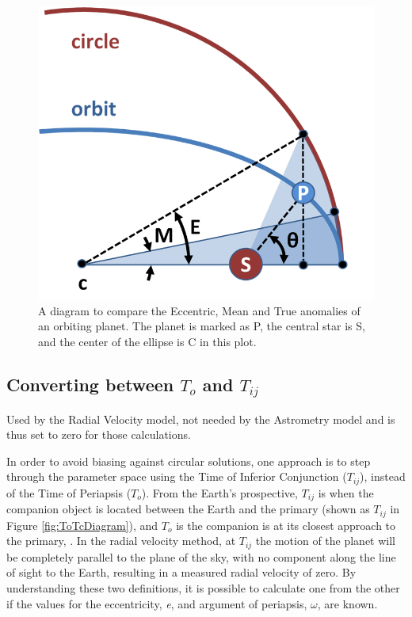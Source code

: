 \documentclass[12pt,preprint]{aastex}
\begin{document}
\begin{figure}[ht]
\begin{center}
\includegraphics[scale=0.4]{Figures/Anomalies-MOD.png}
\caption[Diagram of Anomalies]{A diagram to compare the Eccentric, Mean and True anomalies of an orbiting planet.  The planet is marked as P, the central star is S, and the center of the ellipse is C in this plot. }
\label{fig:Anomalies}
\end{center}
\end{figure}
\clearpage
\subsection{Converting between $T_o$ and $T_{ij}$}\label{sec:ToTcCalculator}

Used by the Radial Velocity model, not needed by the Astrometry model and is thus set to zero for those calculations.

In order to avoid biasing against circular solutions, one approach is to step through the parameter space using the Time of Inferior Conjunction ($T_{ij}$), instead of the Time of Periapsis ($T_o$).  From the Earth's prospective, $T_{ij}$ is when the companion object is located between the Earth and the primary (shown as {\color{green}$T_{ij}$} in Figure \ref{fig:ToTcDiagram}), and $T_o$ is the companion is at its closest approach to the primary, \citep{heintz}. In the radial velocity method, at $T_{ij}$ the motion of the planet will be completely parallel to the plane of the sky, with no component along the line of sight to the Earth, resulting in a measured radial velocity of zero.  By understanding these two definitions, it is possible to calculate one from the other if the values for the eccentricity, {\it e}, and argument of periapsis, $\omega$, are known.
\end{document}
